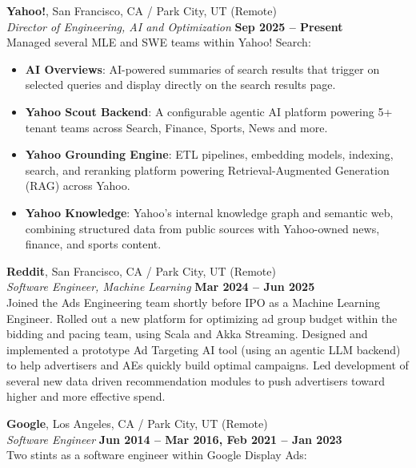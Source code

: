 \documentclass[margin,line]{resume}
\begin{document}
\begin{resume}
    \textbf{Yahoo!}, San Francisco, CA / Park City, UT (Remote)  \vspace{2mm}\\\vspace{1mm}%
    \textsl{Director of Engineering, AI and Optimization} \hfill \textbf{Sep 2025 -- Present}\\
    Managed several MLE and SWE teams within Yahoo! Search:
    \begin{itemize}
      \item \textbf{AI Overviews}: AI-powered summaries of search results that trigger on selected queries and display directly on the search results page.
      \item \textbf{Yahoo Scout Backend}: A configurable agentic AI platform powering 5+ tenant teams across Search, Finance, Sports, News and more.
      \item \textbf{Yahoo Grounding Engine}: ETL pipelines, embedding models, indexing, search, and reranking platform powering Retrieval-Augmented Generation (RAG) across Yahoo.
      \item \textbf{Yahoo Knowledge}: Yahoo's internal knowledge graph and semantic web, combining structured data from public sources with Yahoo-owned news, finance, and sports content.
    \end{itemize}

    \textbf{Reddit}, San Francisco, CA / Park City, UT (Remote)  \vspace{2mm}\\\vspace{1mm}%
    \textsl{Software Engineer, Machine Learning} \hfill \textbf{Mar 2024 -- Jun 2025}\\
    Joined the Ads Engineering team shortly before IPO as a Machine Learning Engineer.
    Rolled out a new platform for optimizing ad group budget within the bidding
    and pacing team, using Scala and Akka Streaming. Designed and implemented a
    prototype Ad Targeting AI tool (using an agentic LLM backend) to help
    advertisers and AEs quickly build optimal campaigns. Led development of
    several new data driven recommendation modules to push advertisers toward
    higher and more effective spend.

    \textbf{Google}, Los Angeles, CA / Park City, UT (Remote)  \vspace{2mm}\\\vspace{1mm}%
    \textsl{Software Engineer} \hfill \textbf{Jun 2014 -- Mar 2016, Feb 2021 -- Jan 2023}\\
    Two stints as a software engineer within Google Display Ads:


\end{resume}
\end{document}

